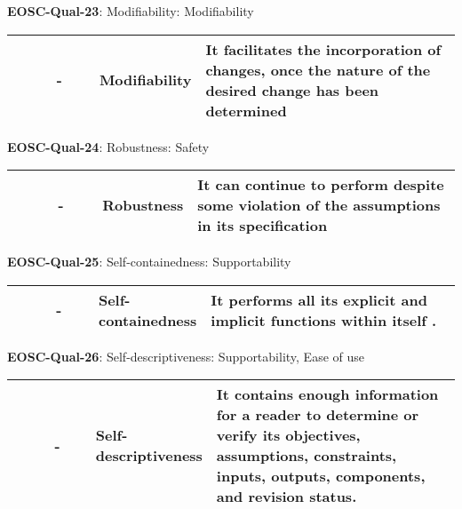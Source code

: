 \textbf{EOSC-Qual-23}: Modifiability: Modifiability
\nopagebreak[4]
\begin{center}
    \tabletail{\hline}
    \tiny
    \begin{supertabular}{|p{0.10\linewidth}|p{0.10\linewidth}|p{0.20\linewidth}|p{0.60\linewidth}|} \hline
        \cite{boehm_quantitative_1976} & - & Modifiability & It facilitates the incorporation of changes, once the nature of the desired change has been determined\\ \hline
    \end{supertabular}
\end{center}

\textbf{EOSC-Qual-24}: Robustness: Safety
\nopagebreak[4]
\begin{center}
    \tabletail{\hline}
    \tiny
    \begin{supertabular}{|p{0.10\linewidth}|p{0.10\linewidth}|p{0.20\linewidth}|p{0.60\linewidth}|} \hline
        \cite{boehm_quantitative_1976} & - & Robustness & It can continue to perform despite some violation of the assumptions in its specification\\ \hline
    \end{supertabular}
\end{center}

\textbf{EOSC-Qual-25}: Self-containedness: Supportability
\nopagebreak[4]
\begin{center}
    \tabletail{\hline}
    \tiny
    \begin{supertabular}{|p{0.10\linewidth}|p{0.10\linewidth}|p{0.20\linewidth}|p{0.60\linewidth}|} \hline
        \cite{boehm_quantitative_1976} & - & Self-containedness & It performs all its explicit and implicit functions within itself .\\ \hline
    \end{supertabular}
\end{center}

\textbf{EOSC-Qual-26}: Self-descriptiveness: Supportability, Ease of use
\nopagebreak[4]
\begin{center}
    \tabletail{\hline}
    \tiny
    \begin{supertabular}{|p{0.10\linewidth}|p{0.10\linewidth}|p{0.20\linewidth}|p{0.60\linewidth}|} \hline
        \cite{boehm_quantitative_1976} & - & Self-descriptiveness & It contains enough information for a reader to determine or verify its objectives, assumptions, constraints, inputs, outputs, components, and revision status.\\ \hline
    \end{supertabular}
\end{center}

